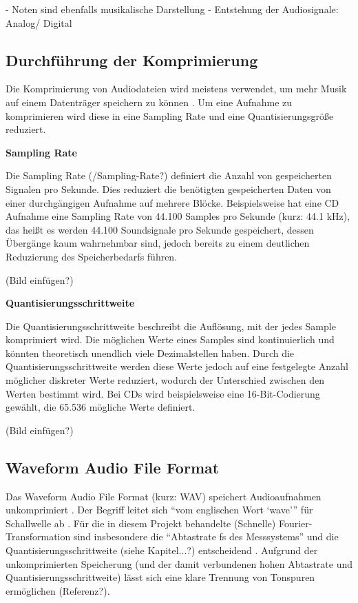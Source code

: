 %
 - Noten sind ebenfalls musikalische Darstellung
 - Entstehung der Audiosignale: Analog/ Digital

%
\subsection{Durchführung der Komprimierung}
%

Die Komprimierung von Audiodateien wird meistens verwendet, um mehr Musik auf einem Datenträger speichern zu können \parencite{what_is_audio_compression}. Um eine Aufnahme zu komprimieren wird diese in eine Sampling Rate und eine Quantisierungsgröße reduziert.

\par

%
\textbf{Sampling Rate}
%

Die Sampling Rate (/Sampling-Rate?) definiert die Anzahl von gespeicherten Signalen pro Sekunde. Dies reduziert die benötigten gespeicherten Daten von einer durchgängigen Aufnahme auf mehrere Blöcke. Beispielsweise hat eine CD Aufnahme eine Sampling Rate von 44.100 Samples pro Sekunde (kurz: 44.1 kHz), das heißt es werden 44.100 Soundsignale pro Sekunde gespeichert, dessen Übergänge kaum wahrnehmbar sind, jedoch bereits zu einem deutlichen Reduzierung des Speicherbedarfs führen.

%
(Bild einfügen?)
%

%
\textbf{Quantisierungsschrittweite}
%

Die Quantisierungsschrittweite beschreibt die Auflösung, mit der jedes Sample komprimiert wird. Die möglichen Werte eines Samples sind kontinuierlich und könnten theoretisch unendlich viele Dezimalstellen haben. Durch die Quantisierungsschrittweite werden diese Werte jedoch auf eine festgelegte Anzahl möglicher diskreter Werte reduziert, wodurch der Unterschied zwischen den Werten bestimmt wird. Bei CDs wird beispielsweise eine 16-Bit-Codierung gewählt, die 65.536 mögliche Werte definiert.

%
(Bild einfügen?)
%

%
\subsection{Waveform Audio File Format}
%

Das Waveform Audio File Format (kurz: WAV) speichert Audioaufnahmen unkomprimiert \parencite{what_is_a_wav_file}. Der Begriff leitet sich \enquote{vom englischen Wort \enquote{wave}} für Schallwelle ab \parencite{wav}. Für die in diesem Projekt behandelte (Schnelle) Fourier-Transformation sind insbesondere die \enquote{Abtastrate fs des Messsystems} und die Quantisierungsschrittweite (siehe Kapitel...?) entscheidend  \parencite{FFT_grundlagen}. Aufgrund der unkomprimierten Speicherung (und der damit verbundenen hohen Abtastrate und Quantisierungsschrittweite) lässt sich eine klare Trennung von Tonspuren ermöglichen (Referenz?).


